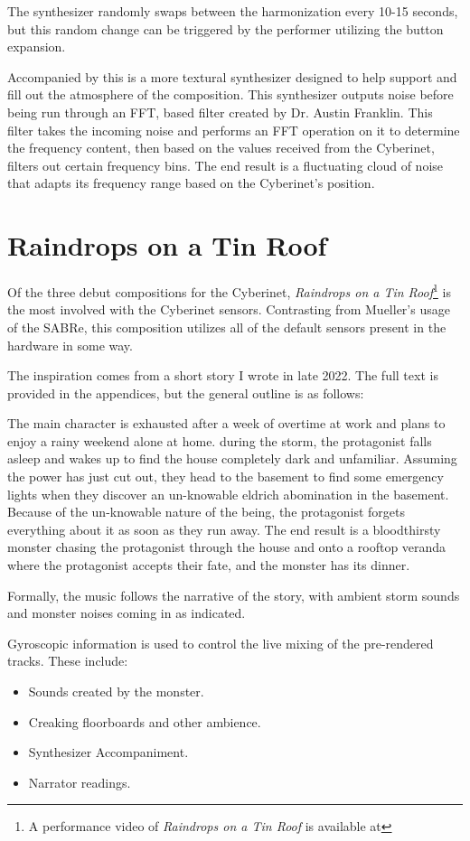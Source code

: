 The synthesizer randomly swaps between the harmonization every 10-15 seconds, but this random change can be triggered by the performer utilizing the button expansion.

Accompanied by this is a more textural synthesizer designed to help support and fill out the atmosphere of the composition. This synthesizer outputs noise before being run through an FFT, based filter created by Dr. Austin Franklin. This filter takes the incoming noise and performs an FFT operation on it to determine the frequency content, then based on the values received from the Cyberinet, filters out certain frequency bins. The end result is a fluctuating cloud of noise that adapts its frequency range based on the Cyberinet's position.


\section{Raindrops on a Tin Roof}
Of the three debut compositions for the Cyberinet, \textit{Raindrops on a Tin Roof}\footnote{A performance video of \textit{Raindrops on a Tin Roof} is available at} is the most involved with the Cyberinet sensors. Contrasting from Mueller's usage of the SABRe, this composition utilizes all of the default sensors present in the hardware in some way. 

The inspiration comes from a short story I wrote in late 2022. The full text is provided in the appendices, but the general outline is as follows:

The main character is exhausted after a week of overtime at work and plans to enjoy a rainy weekend alone at home. during the storm, the protagonist falls asleep and wakes up to find the house completely dark and unfamiliar. Assuming the power has just cut out, they head to the basement to find some emergency lights when they discover an un-knowable eldrich abomination in the basement. Because of the un-knowable nature of the being, the protagonist forgets everything about it as soon as they run away. The end result is a bloodthirsty monster chasing the protagonist through the house and onto a rooftop veranda where the protagonist accepts their fate, and the monster has its dinner.

Formally, the music follows the narrative of the story, with ambient storm sounds and monster noises coming in as indicated. 

Gyroscopic information is used to control the live mixing of the pre-rendered tracks. These include:
\begin{itemize}
    \item Sounds created by the monster.
    \item Creaking floorboards and other ambience.
    \item Synthesizer Accompaniment.
    \item Narrator readings.
\end{itemize}

